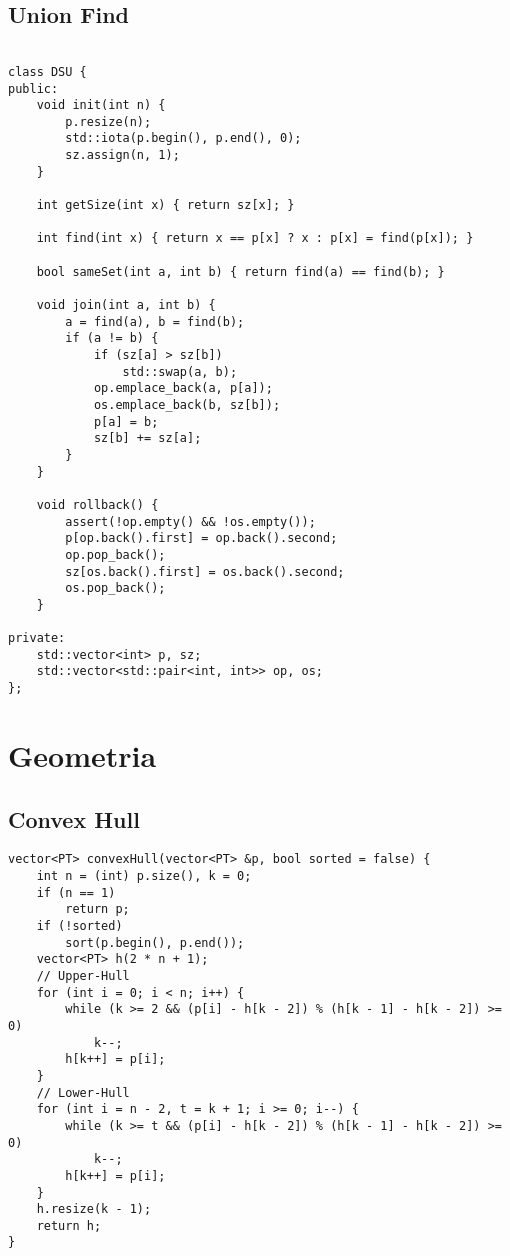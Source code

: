 \documentclass[12pt, a4paper, twoside]{article}
\begin{document}
\subsection{Union Find
}
\begin{lstlisting}

class DSU {
public:
	void init(int n) {
		p.resize(n);
		std::iota(p.begin(), p.end(), 0);
		sz.assign(n, 1);
	}

	int getSize(int x) { return sz[x]; }

	int find(int x) { return x == p[x] ? x : p[x] = find(p[x]); }

	bool sameSet(int a, int b) { return find(a) == find(b); }

	void join(int a, int b) {
		a = find(a), b = find(b);
		if (a != b) {
			if (sz[a] > sz[b])
				std::swap(a, b);
			op.emplace_back(a, p[a]);
			os.emplace_back(b, sz[b]);
			p[a] = b;
			sz[b] += sz[a];
		}
	}

	void rollback() {
		assert(!op.empty() && !os.empty());
		p[op.back().first] = op.back().second;
		op.pop_back();
		sz[os.back().first] = os.back().second;
		os.pop_back();
	}

private:
	std::vector<int> p, sz;
	std::vector<std::pair<int, int>> op, os;
};
\end{lstlisting}



%
%

\section{Geometria}

\subsection{Convex Hull
}
\begin{lstlisting}
vector<PT> convexHull(vector<PT> &p, bool sorted = false) {
	int n = (int) p.size(), k = 0;
	if (n == 1)
		return p;
	if (!sorted)
		sort(p.begin(), p.end());
	vector<PT> h(2 * n + 1);
	// Upper-Hull
	for (int i = 0; i < n; i++) {
		while (k >= 2 && (p[i] - h[k - 2]) % (h[k - 1] - h[k - 2]) >= 0)
			k--;
		h[k++] = p[i];
	}
	// Lower-Hull
	for (int i = n - 2, t = k + 1; i >= 0; i--) {
		while (k >= t && (p[i] - h[k - 2]) % (h[k - 1] - h[k - 2]) >= 0)
			k--;
		h[k++] = p[i];
	}
	h.resize(k - 1);
	return h;
}
\end{lstlisting}
\end{document}
